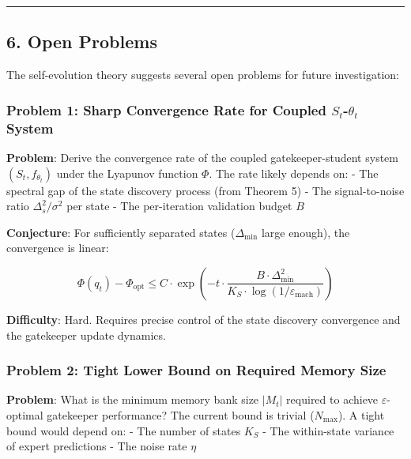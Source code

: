 \documentclass[
  12pt,
]{article}
\begin{document}
\begin{center}\rule{0.5\linewidth}{0.5pt}\end{center}

\subsection{6. Open Problems}\label{open-problems}

The self-evolution theory suggests several open problems for future
investigation:

\subsubsection{\texorpdfstring{Problem 1: Sharp Convergence Rate for
Coupled \(S_t\)-\(\theta_t\)
System}{Problem 1: Sharp Convergence Rate for Coupled S\_t-\textbackslash theta\_t System}}\label{problem-1-sharp-convergence-rate-for-coupled-s_t-theta_t-system}

\textbf{Problem}: Derive the convergence rate of the coupled
gatekeeper-student system \((S_t, f_{\theta_t})\) under the Lyapunov
function \(\Phi\). The rate likely depends on: - The spectral gap of the
state discovery process (from Theorem 5) - The signal-to-noise ratio
\(\Delta_s^2/\sigma^2\) per state - The per-iteration validation budget
\(B\)

\textbf{Conjecture}: For sufficiently separated states
(\(\Delta_{\min}\) large enough), the convergence is linear:

\[\Phi(q_t) - \Phi_{\text{opt}} \leq C \cdot \exp\left(-t \cdot \frac{B \cdot \Delta_{\min}^2}{K_S \cdot \log(1/\varepsilon_{\text{mach}})}\right)\]

\textbf{Difficulty}: Hard. Requires precise control of the state
discovery convergence and the gatekeeper update dynamics.

\subsubsection{Problem 2: Tight Lower Bound on Required Memory
Size}\label{problem-2-tight-lower-bound-on-required-memory-size}

\textbf{Problem}: What is the minimum memory bank size \(|M_t|\)
required to achieve \(\varepsilon\)-optimal gatekeeper performance? The
current bound is trivial (\(N_{\text{max}}\)). A tight bound would
depend on: - The number of states \(K_S\) - The within-state variance of
expert predictions - The noise rate \(\eta\)
\end{document}
